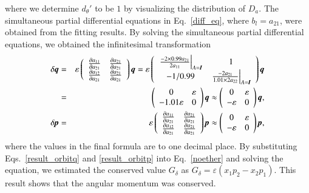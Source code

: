 \documentclass[preprint,
bibnotes,
 amsmath,amssymb,
 aps,
]{revtex4-1}
\begin{document}
where we determine $d_{\theta}'$ to be $1$ by visualizing the distribution of $D_a$. 
The simultaneous partial differential equations in Eq.~\eqref{diff_eq}, where $b_l = a_{21}$, were obtained from the fitting results. By solving the simultaneous partial differential equations, we obtained the infinitesimal transformation
\begin{eqnarray}
\delta \textit{\textbf{q}} &=&
\varepsilon 
\left(
    \begin{array}{cc}
      \frac{\partial a_{11}}{\partial a_{21}} & \frac{\partial a_{21}}{\partial a_{21}}\\
      \frac{\partial a_{12}}{\partial a_{21}} & \frac{\partial a_{21}}{\partial a_{21}}\\
    \end{array}
  \right)\textit{\textbf{q}} 
  =
\varepsilon 
\left(
    \begin{array}{cc}
\left.\frac{-2\times 0.99a_{21}}{2a_{11}}\right|_{A=\textit{\textbf{I}}} & 1\\
-1/0.99 & \left.\frac{-2a_{21}}{1.01 \times 2a_{22}}\right|_{A=\textit{\textbf{I}}}
    \end{array}
  \right)\textit{\textbf{q}} \\
 &=& 
\left(
    \begin{array}{cc}
0 & \varepsilon \\
-1.01\varepsilon & 0
    \end{array}
  \right)\textit{\textbf{q}} \approx
  \left(
    \begin{array}{cc}
0 & \varepsilon\\
-\varepsilon & 0
    \end{array}
  \right)\textit{\textbf{q}}, \label{result_orbitq}\\ 
\delta \textit{\textbf{p}} &=&
\varepsilon     \left(\begin{array}{cc}
      \frac{\partial a_{11}}{\partial a_{21}} & \frac{\partial a_{21}}{\partial a_{21}}\\
      \frac{\partial a_{12}}{\partial a_{21}} & \frac{\partial a_{21}}{\partial a_{21}}\\
    \end{array}\right)\textit{\textbf{p}}
\approx \left(
    \begin{array}{cc}
0 & \varepsilon\\
-\varepsilon & 0
    \end{array}
  \right)\textit{\textbf{p}}\label{result_orbitp},
\end{eqnarray}
where the values in the final formula are to one decimal place.
By substituting Eqs.~\eqref{result_orbitq} and \eqref{result_orbitp} into Eq.~\eqref{noether} and solving the equation, we estimated the conserved value $G_{\delta}$ as $G_{\delta} = \varepsilon (x_1p_2 - x_2p_1)$. 
This result shows that the angular momentum was conserved. 
\end{document}
